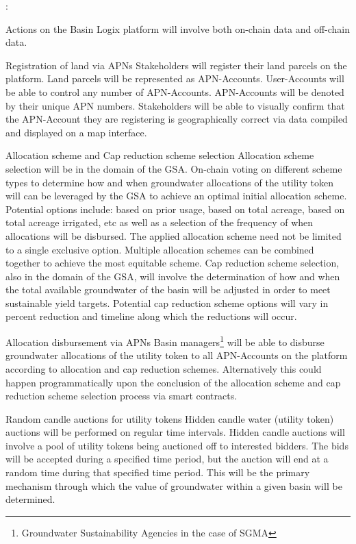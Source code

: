 \documentclass{tufte-handout}
\begin{document}
:

	Actions on the Basin Logix platform will involve both on-chain data and off-chain data. \break 

Registration of land via APNs \break
Stakeholders will register their land parcels on the platform. Land parcels will be represented as APN-Accounts. User-Accounts will be able to control any number of APN-Accounts. APN-Accounts will be denoted by their unique APN numbers. Stakeholders will be able to visually confirm that the APN-Account they are registering is geographically correct via data compiled and displayed on a map interface. 

Allocation scheme and Cap reduction scheme selection \break
Allocation scheme selection will be in the domain of the GSA. On-chain voting on different scheme types to determine how and when groundwater allocations of the utility token will can be leveraged by the GSA to achieve an optimal initial allocation scheme. Potential options include: based on prior usage, based on total acreage, based on total acreage irrigated, etc as well as a selection of the frequency of when allocations will be disbursed. The applied allocation scheme need not be limited to a single exclusive option. Multiple allocation schemes can be combined together to achieve the most equitable scheme. Cap reduction scheme selection, also in the domain of the GSA, will involve the determination of how and when the total available groundwater of the basin will be adjusted in order to meet sustainable yield targets. Potential cap reduction scheme options will vary in percent reduction and timeline along which the reductions will occur. 

Allocation disbursement via APNs \break
Basin managers\footnote{Groundwater Sustainability Agencies in the case of SGMA} will be able to disburse groundwater allocations of the utility token to all APN-Accounts on the platform according to allocation and cap reduction schemes. Alternatively this could happen programmatically upon the conclusion of the allocation scheme and cap reduction scheme selection process via smart contracts. 

Random candle auctions for utility tokens \break
Hidden candle water (utility token) auctions will be performed on regular time intervals. Hidden candle auctions\cite{candle} will involve a pool of utility tokens being auctioned off to interested bidders. The bids will be accepted during a specified time period, but the auction will end at a random time during that specified time period. This will be the primary mechanism through which the value of groundwater within a given basin will be determined. 
\end{document}
